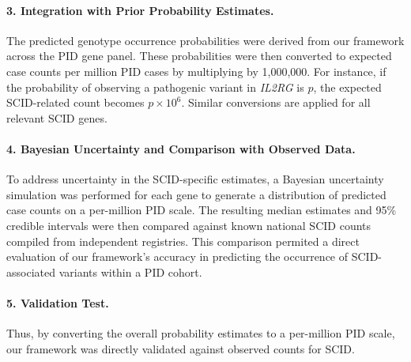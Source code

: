 \paragraph{3. Integration with Prior Probability Estimates.}
The predicted genotype occurrence probabilities were derived from our framework across the PID gene panel. These probabilities were then converted to expected case counts per million PID cases by multiplying by 1,000,000. For instance, if the probability of observing a pathogenic variant in \textit{IL2RG} is \(p\), the expected SCID-related count becomes \(p \times 10^6\). Similar conversions are applied for all relevant SCID genes.

\paragraph{4. Bayesian Uncertainty and Comparison with Observed Data.}
To address uncertainty in the SCID-specific estimates, a Bayesian uncertainty simulation was performed for each gene to generate a distribution of predicted case counts on a per-million PID scale. The resulting median estimates and 95\% credible intervals were then compared against known national SCID counts compiled from independent registries. This comparison permited a direct evaluation of our framework’s accuracy in predicting the occurrence of SCID-associated variants within a PID cohort.

\paragraph{5. Validation Test.}
Thus, by converting the overall probability estimates to a per-million PID scale, our framework was directly validated against observed counts for SCID. %


